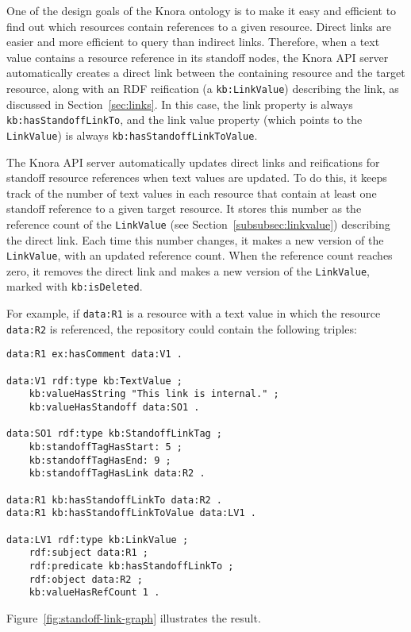 \documentclass[12pt, a4paper]{article}
\begin{document}
One of the design goals of the Knora ontology is to make it easy and efficient to find out which resources contain references to a given resource. Direct links are easier and more efficient to query than indirect links. Therefore, when a text value contains a resource reference in its standoff nodes, the Knora API server automatically creates a direct link between the containing resource and the target resource, along with an RDF reification (a \texttt{kb:LinkValue}) describing the link, as discussed in Section~\ref{sec:links}. In this case, the link property is always \texttt{kb:hasStandoffLinkTo}, and the link value property (which points to the \texttt{LinkValue}) is always \texttt{kb:hasStandoffLinkToValue}.

The Knora API server automatically updates direct links and reifications for standoff resource references when text values are updated. To do this, it keeps track of the number of text values in each resource that contain at least one standoff reference to a given target resource. It stores this number as the reference count of the \texttt{LinkValue} (see Section~\ref{subsubsec:linkvalue}) describing the direct link. Each time this number changes, it makes a new version of the \texttt{LinkValue}, with an updated reference count. When the reference count reaches zero, it removes the direct link and makes a new version of the \texttt{LinkValue}, marked with \texttt{kb:isDeleted}.

For example, if \texttt{data:R1} is a resource with a text value in which the resource \texttt{data:R2} is referenced, the repository could contain the following triples:

\begin{verbatim}
data:R1 ex:hasComment data:V1 .

data:V1 rdf:type kb:TextValue ;
    kb:valueHasString "This link is internal." ;
    kb:valueHasStandoff data:SO1 .

data:SO1 rdf:type kb:StandoffLinkTag ;
    kb:standoffTagHasStart: 5 ;
    kb:standoffTagHasEnd: 9 ;
    kb:standoffTagHasLink data:R2 .

data:R1 kb:hasStandoffLinkTo data:R2 .
data:R1 kb:hasStandoffLinkToValue data:LV1 . 

data:LV1 rdf:type kb:LinkValue ;
    rdf:subject data:R1 ;
    rdf:predicate kb:hasStandoffLinkTo ;
    rdf:object data:R2 ;
    kb:valueHasRefCount 1 .
\end{verbatim}

Figure~\ref{fig:standoff-link-graph} illustrates the result.
\end{document}
